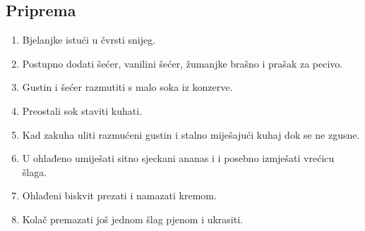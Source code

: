 \documentclass{article}
\begin{document}
\subsection{Priprema}
\begin{enumerate}
  \item Bjelanjke istući u čvrsti snijeg.
  \item Postupno dodati šećer, vanilini šećer, žumanjke brašno i prašak za pecivo.
  \item Gustin i šećer razmutiti s malo soka iz konzerve.
  \item Preostali sok staviti kuhati.
  \item Kad zakuha uliti razmućeni gustin i stalno miješajući kuhaj dok se ne zgusne.
  \item U ohlađeno umiješati sitno sjeckani ananas i i posebno izmješati vrećicu šlaga.
  \item Ohlađeni biskvit prezati i namazati kremom.
  \item Kolač premazati još jednom šlag pjenom i ukrasiti.
\end{enumerate}
\end{document}
